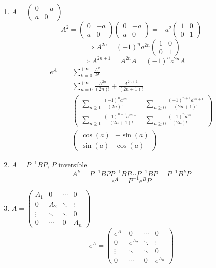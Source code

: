 \documentclass[]{report}
\begin{document}
\begin{ex}
    \begin{enumerate}
        \item $A=\begin{pmatrix}
            0&-a\\
            a&0
        \end{pmatrix}$
        \[A^2=\begin{pmatrix}
            0&-a\\
            a&0
        \end{pmatrix}\begin{pmatrix}
            0&-a\\
            a&0
        \end{pmatrix}=-a^2\begin{pmatrix}
            1&0\\
            0&1
        \end{pmatrix}\]
        \[\implies A^{2n}=(-1)^na^{2n}\begin{pmatrix}
            1&0\\
            0&1
        \end{pmatrix}\]
        \[\implies A^{2n+1}=A^{2n}A=(-1)^n a^{2n}A\]
        \begin{align*}
            e^A&=\sum_{k=0}^{+\infty}\frac{A^k}{k!}\\
            &=\sum_{n=0}^{+\infty}\frac{A^{2n}}{(2n)!}+\frac{A^{2n+1}}{(2n+1)!}\\
            &=\begin{pmatrix}
                \sum_{n\ge 0} \frac{(-1)^na^{2n}}{(2n)!}& \sum_{n\ge 0} \frac{(-1)^{n+1}a^{2n+1}}{(2n+1)!}\\
                \sum_{n\ge 0} \frac{(-1)^{n+1}a^{2n+1}}{(2n+1)!}& \sum_{n\ge 0} \frac{(-1)^na^{2n}}{(2n)!}
            \end{pmatrix}\\
            &=\begin{pmatrix}
                \cos (a)& -\sin (a)\\
                \sin (a)& \cos (a)
            \end{pmatrix}
        \end{align*}
        \item $A=P^{-1}BP$, $P$ inversible
        \[A^k=P^{-1}BPP^{-1}BP\cdots P^{-1}BP=P^{-1}B^kP\]
        \[e^A=P^{-1}e^BP\]
        \item $A=\begin{pmatrix}
            \boxed{A_1}&0&\cdots&0\\
            0&\boxed{A_2}&\ddots&\vdots\\
            \vdots&\ddots&\ddots&0\\
            0&\cdots&0&\boxed{A_n}
        \end{pmatrix}$
        \[e^A=\begin{pmatrix}
            \boxed{e^{A_1}}&0&\cdots&0\\
            0&\boxed{e^{A_2}}&\ddots&\vdots\\
            \vdots&\ddots&\ddots&0\\
            0&\cdots&0&\boxed{e^{A_n}}
        \end{pmatrix}\]


\end{enumerate}
\end{ex}
\end{document}
